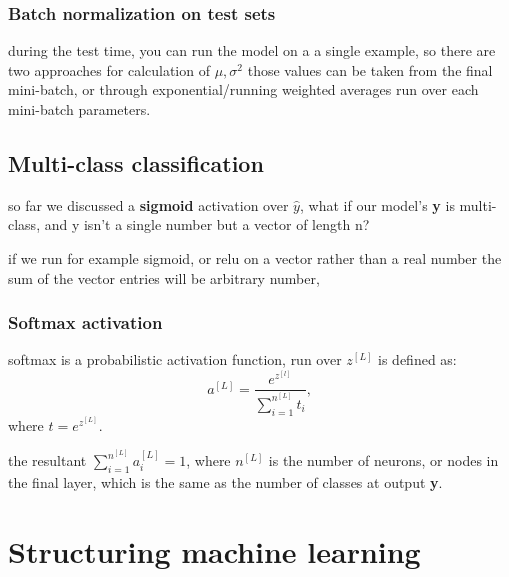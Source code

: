 \documentclass[4apaper,12pt]{book}
\begin{document}
\begin{description}
  \subsection{Batch normalization on test sets}
\item during the test time, you can run the model on a a single example, so there are two approaches for calculation of $\mu, \sigma^2$ those values can be taken from the final mini-batch, or through exponential/running weighted averages run over each mini-batch parameters.
  \end{description}

  \section{Multi-class classification}
  \begin{description}
  \item so far we discussed a \textbf{sigmoid} activation over \textbf{$\hat{y}$}, what if our model's \textbf{y} is multi-class, and y isn't a single number but a vector of length n?
    \item if we run for example sigmoid, or relu on a vector rather than a real number the sum of the vector entries will be arbitrary number,
    \subsection{Softmax activation}
  \item softmax is a probabilistic activation function, run over $z^{[L]}$ is defined as: $$
    a^{[L]}=\frac{e^{z^{[l]}}}{\sum_{i=1}^{n^{[L]}}t_i},$$  where $t=e^{z^{[L]}} $.
    \item the resultant $\sum_{i=1}^{n^{[L]}}{a_i^{[L]}}=1$, where $n^{[L]}$ is the number of neurons, or nodes in the final layer, which is the same as the number of classes at output \textbf{y}.
  \end{description}

  \chapter{Structuring machine learning}
\end{document}

